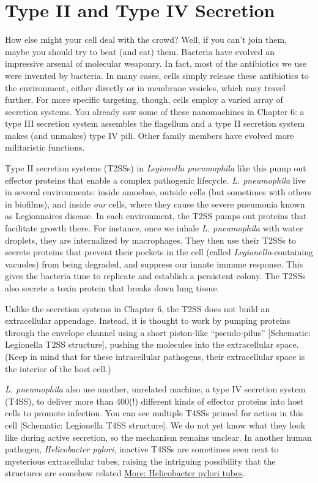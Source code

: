 \documentclass[]{tufte-book}
\begin{document}
\section{Type II and Type IV
Secretion}\label{type-ii-and-type-iv-secretion}

How else might your cell deal with the crowd? Well, if you can't join
them, maybe you should try to beat (and eat) them. Bacteria have evolved
an impressive arsenal of molecular weaponry. In fact, most of the
antibiotics we use were invented by bacteria. In many cases, cells
simply release these antibiotics to the environment, either directly or
in membrane vesicles, which may travel further. For more specific
targeting, though, cells employ a varied array of secretion systems. You
already saw some of these nanomachines in Chapter 6: a type III
secretion system assembles the flagellum and a type II secretion system
makes (and unmakes) type IV pili. Other family members have evolved more
militaristic functions.

Type II secretion systems (T2SSs) in \emph{Legionella pneumophila} like
this pump out effector proteins that enable a complex pathogenic
lifecycle. \emph{L. pneumophila} live in several environments: inside
amoebae, outside cells (but sometimes with others in biofilms), and
inside \emph{our} cells, where they cause the severe pneumonia known as
Legionnaires disease. In each environment, the T2SS pumps out proteins
that facilitate growth there. For instance, once we inhale \emph{L.
pneumophila} with water droplets, they are internalized by macrophages.
They then use their T2SSs to secrete proteins that prevent their pockets
in the cell (called \emph{Legionella}-containing vacuoles) from being
degraded, and suppress our innate immune response. This gives the
bacteria time to replicate and establish a persistent colony. The T2SSs
also secrete a toxin protein that breaks down lung tissue.

Unlike the secretion systems in Chapter 6, the T2SS does not build an
extracellular appendage. Instead, it is thought to work by pumping
proteins through the envelope channel using a short piston-like
``pseudo-pilus'' {[}Schematic: Legionella T2SS structure{]}, pushing the
molecules into the extracellular space. (Keep in mind that for these
intracellular pathogens, their extracellular space is the interior of
the host cell.)

\emph{L. pneumophila} also use another, unrelated machine, a type IV
secretion system (T4SS), to deliver more than 400(!) different kinds of
effector proteins into host cells to promote infection. You can see
multiple T4SSs primed for action in this cell {[}Schematic: Legionella
T4SS structure{]}. We do not yet know what they look like during active
secretion, so the mechanism remains unclear. In another human pathogen,
\emph{Helicobacter pylori}, inactive T4SSs are sometimes seen next to
mysterious extracellular tubes, raising the intriguing possibility that
the structures are somehow related
\protect\hyperlink{Helicobacter_pylori_tubes}{More: Helicobacter pylori
tubes}.
\end{document}
